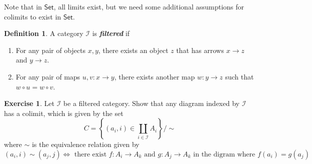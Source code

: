 \documentclass[psamsfonts]{amsart}
\theoremstyle{definition}
\newtheorem{defn}[thm]{Definition}
\newtheorem{exer}[thm]{Exercise}
\theoremstyle{remark}
\newcommand{\ib}[1]{\textbf{\textit{#1}}}
\newcommand{\set}[1]{\left\lbrace #1 \right\rbrace}
\begin{document}
Note that in $\mathsf{Set}$, all limits exist, but we need some additional assumptions for colimits to exist in $\mathsf{Set}$.
%
\begin{defn}
A category $\mathscr{I}$ is \ib{filtered} if
\begin{enumerate}
\item For any pair of objects $x,y$, there exists an object $z$ that has arrows $x \to z$ and $y \to z$.
\item For any pair of maps $u,v : x \to y$, there exists another map $w: y \to z$ such that $w \circ u = w \circ v$.
\end{enumerate}
\end{defn}
%
\begin{exer}
Let $\mathscr{I}$ be a filtered category. Show that any diagram indexed by $\mathscr{I}$ has a colimit, which is given by the set
$$C = \set{(a_i,i) \in \coprod_{i \in \mathscr{I}}A_i} \bigg/ \sim $$
where $\sim$ is the equivalence relation given by
$$(a_i,i) \sim (a_j,j) \iff \text{ there exist } f: A_i \to A_k \text{ and } g: A_j \to A_k \text{ in the digram where } f(a_i) = g(a_j)$$
\end{exer}
%
\end{document}
